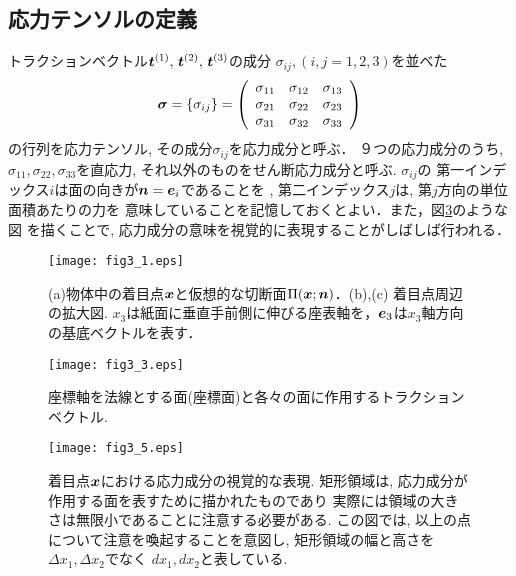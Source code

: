 \documentclass[10pt,a4j]{jarticle}
\begin{document}
\subsection{応力テンソルの定義}
トラクションベクトル$\mbox{\boldmath $t$}^{(1)},\, \mbox{\boldmath $t$}^{(2)},\,\mbox{\boldmath $t$}^{(3)}$の成分
$\sigma_{ij},(i,j=1,2,3)$を並べた
\begin{equation}
	\mbox{\boldmath $\sigma$}=\left\{ \sigma_{ij}\right\}
	=\left(
	\begin{array}{ccc}
		\sigma_{11} & \sigma_{12} & \sigma_{13} \\
		\sigma_{21} & \sigma_{22} & \sigma_{23} \\
		\sigma_{31} & \sigma_{32} & \sigma_{33} 
	\end{array}
	\right)
\end{equation}
の行列を応力テンソル, その成分$\sigma_{ij}$を応力成分と呼ぶ．
９つの応力成分のうち, $\sigma_{11},\sigma_{22},\sigma_{33}$を直応力, 
それ以外のものをせん断応力成分と呼ぶ. $\sigma_{ij}$の
第一インデックス$i$は面の向きが$\mbox{\boldmath $n$}=\mbox{\boldmath $e$}_i$であることを
, 第二インデックス$j$は, 第$j$方向の単位面積あたりの力を
意味していることを記憶しておくとよい．また，図\ref{fig:fig3_5}のような図
を描くことで, 応力成分の意味を視覚的に表現することがしばしば行われる．
\begin{figure}[h]
	\begin{center}
	\texttt{[image: fig3\_1.eps]} 
	\end{center}
	\caption{(a)物体中の着目点$\mbox{\boldmath $x$}$と仮想的な切断面$\Pi(\mbox{\boldmath $x$};\mbox{\boldmath $n$})$．(b),(c) 着目点周辺の拡大図.
	$x_3$は紙面に垂直手前側に伸びる座表軸を，$\mbox{\boldmath $e$}_3$は$x_3$軸方向の基底ベクトルを表す．} 
	\label{fig:fig3_1}
\end{figure}
\begin{figure}[h]
	\begin{center}
	\texttt{[image: fig3\_3.eps]} 
	\end{center}
	\caption{座標軸を法線とする面(座標面)と各々の面に作用するトラクションベクトル.}
	\label{fig:fig3_3}
\end{figure}
\begin{figure}[h]
	\begin{center}
	\texttt{[image: fig3\_5.eps]} 
	\end{center}
	\caption{着目点$\mbox{\boldmath $x$}$における応力成分の視覚的な表現.
	矩形領域は, 応力成分が作用する面を表すために描かれたものであり
	実際には領域の大きさは無限小であることに注意する必要がある.
	この図では, 以上の点について注意を喚起することを意図し, 
	矩形領域の幅と高さを$\Delta x_1, \Delta x_2$でなく
	$dx_1, dx_2$と表している. }
	\label{fig:fig3_5}
\end{figure}
\end{document}
